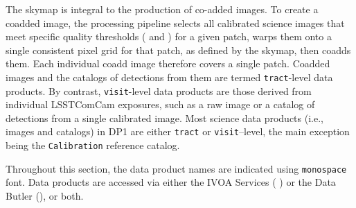 The skymap is integral to the production of co-added images.
To create a coadded image, the processing \gls{pipeline} selects all calibrated science images that meet specific quality thresholds ( and ) for a given patch, warps them onto a single consistent pixel grid for that patch, as defined by the skymap, then coadds them.
Each individual coadd image therefore covers a single \gls{patch}.
Coadded images and the catalogs of detections from them are termed \texttt{tract}-level data products.
By contrast, \texttt{visit}-level data products are those derived from individual \gls{LSSTComCam} exposures, such as a raw image or a catalog of detections from a single calibrated image.
Most science data products (i.e., images and catalogs) in \gls{DP1} are either \texttt{tract} or \texttt{visit}--level, the main exception being the \texttt{Calibration} reference catalog.

Throughout this section, the data product names are indicated using \texttt{monospace} font.
Data products are accessed via either the IVOA Services ( ) or the Data \gls{Butler} (), or both.






